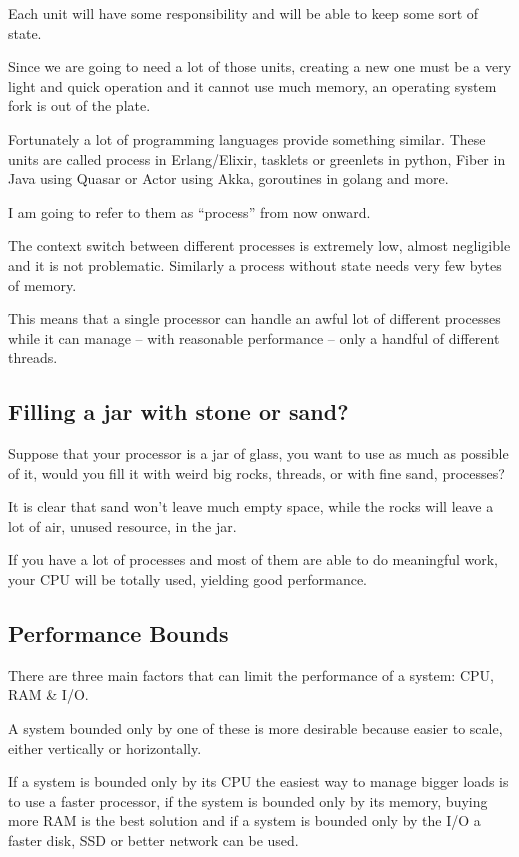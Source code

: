 \documentclass[12pt]{article} %
\begin{document}
Each unit will have some responsibility and will be able to keep some sort of state.

Since we are going to need a lot of those units, creating a new one must be a very light and quick operation and it cannot use much memory, an operating system fork is out of the plate.

Fortunately a lot of programming languages provide something similar. These units are called process in Erlang/Elixir, tasklets or greenlets in python, Fiber in Java using Quasar or Actor using Akka, goroutines in golang and more.

I am going to refer to them as ``process'' from now onward.

The context switch between different processes is extremely low, almost negligible and it is not problematic. Similarly a process without state needs very few bytes of memory.

This means that a single processor can handle an awful lot of different processes while it can manage -- with reasonable performance -- only a handful of different threads.

	\subsection{Filling a jar with stone or sand?}
	
Suppose that your processor is a jar of glass, you want to use as much as possible of it, would you fill it with weird big rocks, threads, or with fine sand, processes?

It is clear that sand won't leave much empty space, while the rocks will leave a lot of air, unused resource, in the jar.

If you have a lot of processes and most of them are able to do meaningful work, your CPU will be totally used, yielding good performance.
	
	\subsection{Performance Bounds}

There are three main factors that can limit the performance of a system: CPU, RAM \& I/O.

A system bounded only by one of these is more desirable because easier to scale, either vertically or horizontally.

If a system is bounded only by its CPU the easiest way to manage bigger loads is to use a faster processor, if the system is bounded only by its memory, buying more RAM is the best solution and if a system is bounded only by the I/O a faster disk, SSD or better network can be used.
\end{document}
